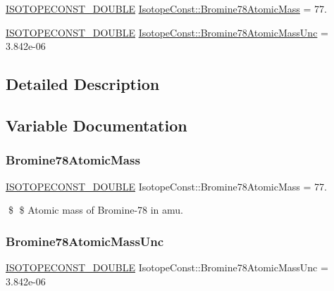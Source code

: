 \begin{DoxyCompactItemize}
\item 
\mbox{\hyperlink{group___isotope_const-_macros_ga8f45a7272ce02c0b4c65c44636ed719a}{I\+S\+O\+T\+O\+P\+E\+C\+O\+N\+S\+T\+\_\+\+D\+O\+U\+B\+LE}} \mbox{\hyperlink{group___isotope_const-_bromine-_br78_gaefdaea95a6885f49f89d016d7da4b98b}{Isotope\+Const\+::\+Bromine78\+Atomic\+Mass}} = 77.
\item 
\mbox{\hyperlink{group___isotope_const-_macros_ga8f45a7272ce02c0b4c65c44636ed719a}{I\+S\+O\+T\+O\+P\+E\+C\+O\+N\+S\+T\+\_\+\+D\+O\+U\+B\+LE}} \mbox{\hyperlink{group___isotope_const-_bromine-_br78_ga0d6e35f6042cd3316e57c6a3c55c0098}{Isotope\+Const\+::\+Bromine78\+Atomic\+Mass\+Unc}} = 3.\+842e-\/06
\end{DoxyCompactItemize}


\subsection{Detailed Description}


\subsection{Variable Documentation}
\mbox{\label{group___isotope_const-_bromine-_br78_gaefdaea95a6885f49f89d016d7da4b98b}} 
\subsubsection{\texorpdfstring{Bromine78\+Atomic\+Mass}{Bromine78AtomicMass}}
{\footnotesize\ttfamily \mbox{\hyperlink{group___isotope_const-_macros_ga8f45a7272ce02c0b4c65c44636ed719a}{I\+S\+O\+T\+O\+P\+E\+C\+O\+N\+S\+T\+\_\+\+D\+O\+U\+B\+LE}} Isotope\+Const\+::\+Bromine78\+Atomic\+Mass = 77.}

\$ \$ Atomic mass of Bromine-\/78 in amu. \mbox{\label{group___isotope_const-_bromine-_br78_ga0d6e35f6042cd3316e57c6a3c55c0098}} 
\subsubsection{\texorpdfstring{Bromine78\+Atomic\+Mass\+Unc}{Bromine78AtomicMassUnc}}
{\footnotesize\ttfamily \mbox{\hyperlink{group___isotope_const-_macros_ga8f45a7272ce02c0b4c65c44636ed719a}{I\+S\+O\+T\+O\+P\+E\+C\+O\+N\+S\+T\+\_\+\+D\+O\+U\+B\+LE}} Isotope\+Const\+::\+Bromine78\+Atomic\+Mass\+Unc = 3.\+842e-\/06}

